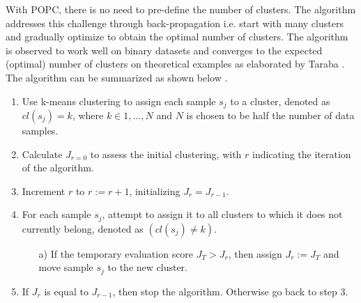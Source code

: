 \documentclass[AMA,Times1COL]{WileyNJDv5} %
\begin{document}
	With POPC, there is no need to pre-define the number of clusters. The algorithm addresses this challenge through back-propagation i.e. start with many clusters and gradually optimize to obtain the optimal number of clusters. The algorithm is observed to work well on binary datasets and converges to the expected (optimal) number of clusters on theoretical examples as elaborated by Taraba \cite{taraba2017clustering}. The algorithm can be summarized as shown below \cite{taraba2017clustering}.
	\begin{enumerate}
		\item Use k-means clustering to assign each sample $s_j$ to a cluster, denoted as $cl(s_j) = k$, where $k \in {1, ..., N}$ and $N$ is chosen to be half the number of data samples.
		\item Calculate $J_{r=0}$ to assess the initial clustering, with $r$ indicating the iteration of the algorithm.
		\item Increment $r$ to $r := r + 1$, initializing $J_r = J_{r-1}$.
		\item For each sample $s_j$, attempt to assign it to all clusters to which it does not currently belong, denoted as $(cl(s_j) \neq k)$.
		\begin{enumerate}
			\item [a)] If the temporary evaluation score $J_T > J_r$, then assign $J_r := J_T$ and move sample $s_j$ to the new cluster. 
		\end{enumerate}
		\item If $J_r$ is equal to $J_{r-1}$, then stop the algorithm. Otherwise go back to step 3.
	\end{enumerate}
	
\end{document}
